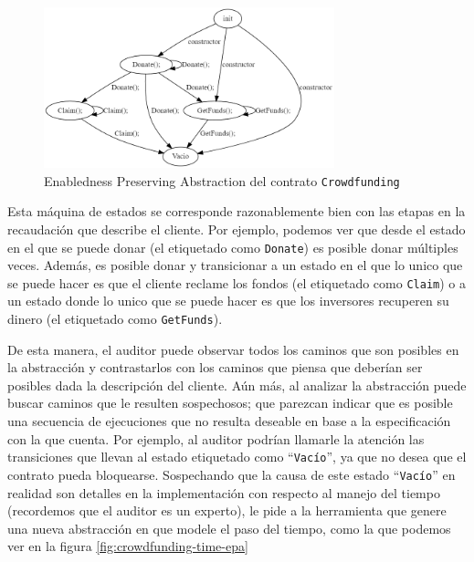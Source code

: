 \begin{figure}
    \centering
    \includegraphics[width=0.75\textwidth]{figs/crowdfunding-epa.png}
    \caption{Enabledness Preserving Abstraction del contrato \texttt{Crowdfunding} }
    \label{fig:crowdfunding-epa}
\end{figure}

Esta máquina de estados se corresponde razonablemente bien con las etapas en la recaudación que describe el cliente.
Por ejemplo, podemos ver que desde el estado en el que se puede donar (el etiquetado como \texttt{Donate}) es posible donar múltiples veces.
Además, es posible donar y transicionar a un estado en el que lo unico que se puede hacer es que el cliente reclame los fondos (el etiquetado como \texttt{Claim}) o a un estado donde lo unico que se puede hacer es que los inversores recuperen su dinero (el etiquetado como \texttt{GetFunds}).

De esta manera, el auditor puede observar todos los caminos que son posibles en la abstracción y contrastarlos con los caminos que piensa que deberían ser posibles dada la descripción del cliente.
Aún más, al analizar la abstracción puede buscar caminos que le resulten sospechosos; que parezcan indicar que es posible una secuencia de ejecuciones que no resulta deseable en base a la especificación con la que cuenta.
Por ejemplo, al auditor podrían llamarle la atención las transiciones que llevan al estado etiquetado como ``\texttt{Vacío}'', ya que no desea que el contrato pueda bloquearse.
Sospechando que la causa de este estado ``\texttt{Vacío}'' en realidad son detalles en la implementación con respecto al manejo del tiempo (recordemos que el auditor es un experto), le pide a la herramienta que genere una nueva abstracción en que modele el paso del tiempo, como la que podemos ver en la figura \ref{fig:crowdfunding-time-epa}

